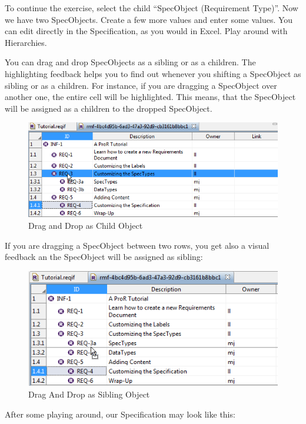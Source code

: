 To continue the exercise, select the child ``SpecObject (Requirement
Type)''. Now we have two SpecObjects. Create a few more values and enter
some values. You can edit directly in the Specification, as you would in
Excel. Play around with Hierarchies.

You can drag and drop SpecObjects as a sibling or as a children. The
highlighting feedback helps you to find out whenever you shifting a
SpecObject as sibling or as a children. For instance, if you are
dragging a SpecObject over another one, the entire cell will be
highlighted. This means, that the SpecObject will be assigned as a
children to the dropped SpecObject.

\begin{figure}[h!]
\centering
\includegraphics[width=\linewidth]{../rmf-images/feedback1.png}      
\caption{Drag and Drop as Child Object}      
\label{fig:dragAndDropChild}
\end{figure}

If you are dragging a SpecObject between two rows, you get also a visual
feedback an the SpecObject will be assigned as sibling:

\begin{figure}[h!]
\centering      
\includegraphics[width=0.8\linewidth]{../rmf-images/feedback2.png}      
\caption{Drag And Drop as Sibling Object}      
\label{fig:dragAndDropSibling}
\end{figure}

After some playing around, our Specification may look like this:

